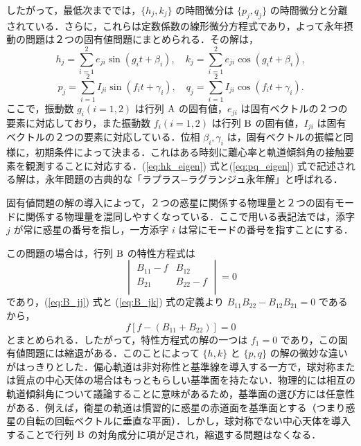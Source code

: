 \documentclass[11pt,a4paper,oneside,onecolumn]{jarticle}
\begin{document}
したがって，最低次まででは，$\{ h_j, k_j \}$ の時間微分は $\{ p_j, q_j \}$ の時間微分と分離されている．さらに，これらは定数係数の線形微分方程式であり，よって永年摂動の問題は２つの固有値問題にまとめられる．その解は，
\begin{equation}
h_j = \sum_{i = 1}^2 e_{ji} \sin (g_i t + \beta_i), \quad k_j = \sum_{i=1}^2 e_{ji} \cos (g_i t + \beta_i), \label{eq:hk_eigen}
\end{equation}
\begin{equation}
p_j = \sum_{i = 1}^2 I_{ji} \sin (f_i t + \gamma_i), \quad q_j = \sum_{i=1}^2 I_{ji} \cos (f_i t + \gamma_i). \label{eq:pq_eigen}
\end{equation}
ここで，振動数 $g_i (i = 1, 2)$ は行列 ${\rm A}$ の固有値，$e_{ji}$ は固有ベクトルの２つの要素に対応しており，また振動数 $f_i (i = 1, 2)$ は行列 ${\rm B}$ の固有値，$I_{ji}$ は固有ベクトルの２つの要素に対応している．位相 $\beta_i, \gamma_i$ は，固有ベクトルの振幅と同様に，初期条件によって決まる．これはある時刻に離心率と軌道傾斜角の接触要素を観測することに対応する．(\ref{eq:hk_eigen}) 式と(\ref{eq:pq_eigen}) 式で記述される解は，永年問題の古典的な「ラプラス−ラグランジュ永年解」と呼ばれる．

固有値問題の解の導入によって，２つの惑星に関係する物理量と２つの固有モードに関係する物理量を混同しやすくなっている．ここで用いる表記法では，添字 $j$ が常に惑星の番号を指し，一方添字 $i$ は常にモードの番号を指すことにする．

この問題の場合は，行列 ${\rm B}$ の特性方程式は
\begin{equation}
\begin{vmatrix}
B_{11} - f & B_{12} \\
B_{21} & B_{22} - f \\
\end{vmatrix}
= 0
\end{equation}
であり，(\ref{eq:B_jj}) 式と (\ref{eq:B_jk}) 式の定義より $B_{11} B_{22} - B_{12} B_{21} = 0$ であるから，
\begin{equation}
f \left[ f - (B_{11} + B_{22}) \right] = 0
\end{equation}
とまとめられる．したがって，特性方程式の解の一つは $f_1 = 0$ であり，この固有値問題には縮退がある．このことによって $\{ h, k \}$ と $\{ p, q \}$ の解の微妙な違いがはっきりとした．偏心軌道は非対称性と基準線を導入する一方で，球対称または質点の中心天体の場合はもっともらしい基準面を持たない．物理的には相互の軌道傾斜角について議論することに意味があるため，基準面の選び方には任意性がある．例えば，衛星の軌道は慣習的に惑星の赤道面を基準面とする（つまり惑星の自転の回転ベクトルに垂直な平面）．しかし，球対称でない中心天体を導入することで行列 ${\rm B}$ の対角成分に項が足され，縮退する問題はなくなる． 
\end{document}
